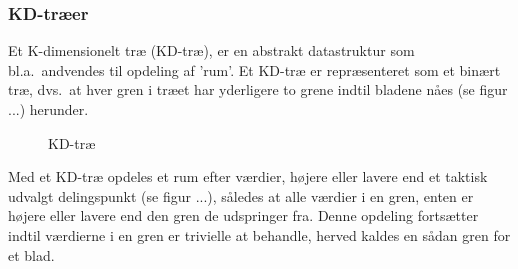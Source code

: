 \subsubsection{KD-træer}
\label{sec:kdtree}

Et K-dimensionelt træ (KD-træ), er en abstrakt datastruktur som bl.a.\ andvendes til opdeling af 'rum'. Et KD-træ er repræsenteret som et binært træ, dvs.\ at
hver gren i træet har yderligere to grene indtil bladene nåes (se figur ...) herunder. 

\begin{figure}[H]
  \centering
  \caption{KD-træ}
  \label{fig:kd-tree}
\end{figure}

Med et KD-træ opdeles et rum efter værdier, højere eller lavere end et taktisk udvalgt delingspunkt (se figur ...),
således at alle værdier i en gren, enten er højere eller lavere end den gren de udspringer fra. Denne  opdeling fortsætter indtil værdierne i en gren er trivielle at behandle, herved kaldes en sådan gren for et blad.
